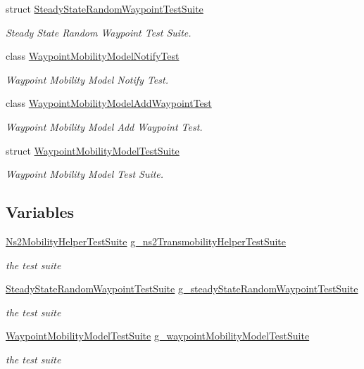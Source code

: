 \begin{DoxyCompactItemize}
struct \hyperlink{structSteadyStateRandomWaypointTestSuite}{Steady\+State\+Random\+Waypoint\+Test\+Suite}
\begin{DoxyCompactList}\small\item\em Steady State Random Waypoint Test Suite. \end{DoxyCompactList}\item 
class \hyperlink{classWaypointMobilityModelNotifyTest}{Waypoint\+Mobility\+Model\+Notify\+Test}
\begin{DoxyCompactList}\small\item\em Waypoint Mobility Model Notify Test. \end{DoxyCompactList}\item 
class \hyperlink{classWaypointMobilityModelAddWaypointTest}{Waypoint\+Mobility\+Model\+Add\+Waypoint\+Test}
\begin{DoxyCompactList}\small\item\em Waypoint Mobility Model Add Waypoint Test. \end{DoxyCompactList}\item 
struct \hyperlink{structWaypointMobilityModelTestSuite}{Waypoint\+Mobility\+Model\+Test\+Suite}
\begin{DoxyCompactList}\small\item\em Waypoint Mobility Model Test Suite. \end{DoxyCompactList}\end{DoxyCompactItemize}
\subsection*{Variables}
\begin{DoxyCompactItemize}
\item 
\hyperlink{classNs2MobilityHelperTestSuite}{Ns2\+Mobility\+Helper\+Test\+Suite} \hyperlink{group__mobility-test_ga9cf266ce06398660390512f30445f1cd}{g\+\_\+ns2\+Transmobility\+Helper\+Test\+Suite}
\begin{DoxyCompactList}\small\item\em the test suite \end{DoxyCompactList}\item 
\hyperlink{structSteadyStateRandomWaypointTestSuite}{Steady\+State\+Random\+Waypoint\+Test\+Suite} \hyperlink{group__mobility-test_ga14b35555884e80f253fef7a55c5b5c21}{g\+\_\+steady\+State\+Random\+Waypoint\+Test\+Suite}
\begin{DoxyCompactList}\small\item\em the test suite \end{DoxyCompactList}\item 
\hyperlink{structWaypointMobilityModelTestSuite}{Waypoint\+Mobility\+Model\+Test\+Suite} \hyperlink{group__mobility-test_ga98c7d90d165c941d567251f6ae314ea0}{g\+\_\+waypoint\+Mobility\+Model\+Test\+Suite}
\begin{DoxyCompactList}\small\item\em the test suite \end{DoxyCompactList}\end{DoxyCompactItemize}


